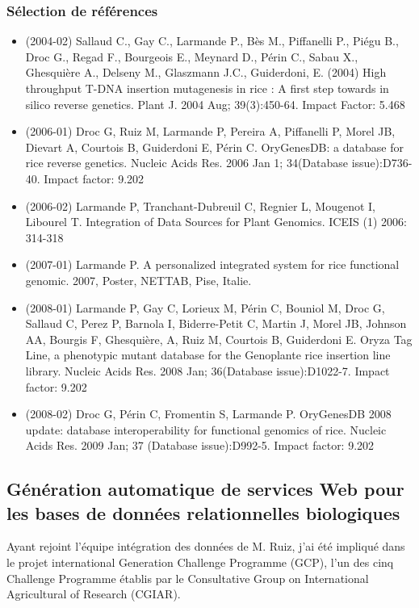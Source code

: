 \subsubsection*{Sélection de références}

\begin{itemize}

\item (2004-02) Sallaud C., Gay C., Larmande P., Bès M., Piffanelli P., Piégu B., Droc G., Regad F., Bourgeois E., Meynard D., Périn C., Sabau X., Ghesquière A., Delseny M., Glaszmann J.C., Guiderdoni, E. (2004) High throughput T-DNA insertion mutagenesis in rice : A first step towards in silico reverse genetics. Plant J. 2004 Aug; 39(3):450-64. Impact Factor: 5.468      
\item (2006-01) Droc G, Ruiz M, Larmande P, Pereira A, Piffanelli P, Morel JB, Dievart A, Courtois B, Guiderdoni E, Périn C. OryGenesDB: a database for rice reverse genetics. Nucleic Acids Res. 2006 Jan 1; 34(Database issue):D736-40. Impact factor: 9.202
\item (2006-02)  Larmande P, Tranchant-Dubreuil C, Regnier L, Mougenot I, Libourel T.
Integration of Data Sources for Plant Genomics. ICEIS (1) 2006: 314-318
\item (2007-01) Larmande P. A personalized integrated system for rice functional genomic. 2007, Poster, NETTAB, Pise, Italie.
\item (2008-01) Larmande P, Gay C, Lorieux M, Périn C, Bouniol M, Droc G, Sallaud C, Perez P, Barnola I, Biderre-Petit C, Martin J, Morel JB, Johnson AA, Bourgis F, Ghesquière, A, Ruiz M, Courtois B, Guiderdoni E. Oryza Tag Line, a phenotypic mutant database for the Genoplante rice insertion line library. Nucleic Acids Res. 2008 Jan; 36(Database issue):D1022-7. Impact factor: 9.202 
\item (2008-02) Droc G, Périn C, Fromentin S, Larmande P. OryGenesDB 2008 update: database interoperability for functional genomics of rice. Nucleic Acids Res. 2009 Jan; 37 (Database issue):D992-5. Impact factor: 9.202

\end{itemize}

\subsection*{Génération automatique de services Web pour les bases de données relationnelles biologiques}
\label{SWS}

Ayant rejoint l’équipe intégration des données de M. Ruiz, j’ai été impliqué dans le projet international Generation Challenge Programme (GCP), l’un des cinq Challenge Programme établis par le Consultative Group on International Agricultural of Research (CGIAR).  \\

